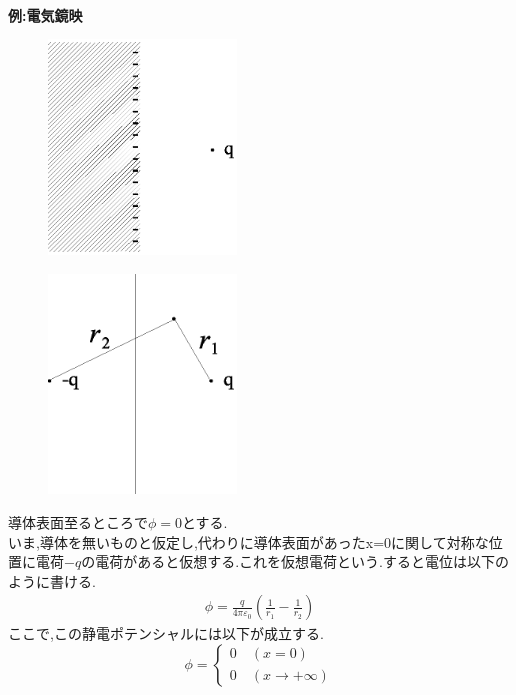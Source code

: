 \documentclass[../main]{subfiles}
\begin{document}
\\
{\bf 例:電気鏡映} \\
\begin{figure}[htbp]
 \begin{center}
  \includegraphics[width=50mm]{7.3.eps}
 \end{center}
 \caption{}
 \label{fig:three}
\end{figure}
\begin{figure}[htbp]
 \begin{center}
  \includegraphics[width=50mm]{7.4.eps}
 \end{center}
 \caption{}
 \label{fig:four}
\end{figure}
導体表面至るところで$\phi=0$とする.\\
いま,導体を無いものと仮定し,代わりに導体表面があったx=0に関して対称な位置に電荷$-q$の電荷があると仮想する.これを仮想電荷という.すると電位は以下のように書ける.
\begin{eqnarray*}
\phi = \frac{q}{4 \pi \varepsilon_0} \left( \frac{1}{r_1} - \frac{1}{r_2} \right)
\end{eqnarray*}
ここで,この静電ポテンシャルには以下が成立する.
\begin{equation*}
\phi =\left \{
\begin{array}{l}
0 \quad (x=0)\\
0 \quad (x \to + \infty)
\end{array}
\right.
\end{equation*}
\end{document}
